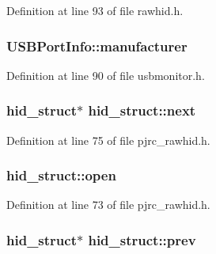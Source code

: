 Definition at line 93 of file rawhid.\-h.

\hypertarget{group___raw_h_i_d_plugin_ga2ab42268838049538e60aa4a7aa3d305}{
\subsubsection[{manufacturer}]{ U\-S\-B\-Port\-Info\-::manufacturer}}\label{group___raw_h_i_d_plugin_ga2ab42268838049538e60aa4a7aa3d305}


Definition at line 90 of file usbmonitor.\-h.

\hypertarget{group___raw_h_i_d_plugin_gafe069ce715c9b005340052f4ea9f1a62}{
\subsubsection[{next}]{ {\bf hid\-\_\-struct}$\ast$ hid\-\_\-struct\-::next}}\label{group___raw_h_i_d_plugin_gafe069ce715c9b005340052f4ea9f1a62}


Definition at line 75 of file pjrc\-\_\-rawhid.\-h.

\hypertarget{group___raw_h_i_d_plugin_gac3065ab2f0080eb3fe182cad3fff15ee}{
\subsubsection[{open}]{ hid\-\_\-struct\-::open}}\label{group___raw_h_i_d_plugin_gac3065ab2f0080eb3fe182cad3fff15ee}


Definition at line 73 of file pjrc\-\_\-rawhid.\-h.

\hypertarget{group___raw_h_i_d_plugin_gac0d9fa3480e665ae9aca8a621a1dc66d}{
\subsubsection[{prev}]{ {\bf hid\-\_\-struct}$\ast$ hid\-\_\-struct\-::prev}}\label{group___raw_h_i_d_plugin_gac0d9fa3480e665ae9aca8a621a1dc66d}



